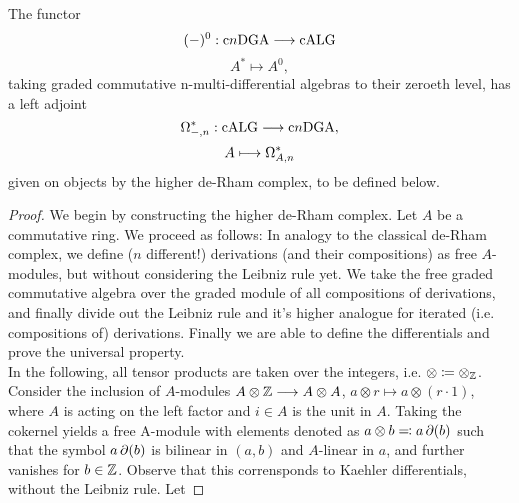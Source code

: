 \begin{prop}\label{prop_higher_de_rahm_complex}
The functor%
$$(-)^0 : \mathrm{c}n\mathrm{DGA} \longrightarrow \mathrm{cALG}$$%
$$A^* \longmapsto A^0,$$%
taking graded commutative n-multi-differential algebras to their zeroeth level, has a left adjoint%
$$\Omega_{-,n}^{*}: \mathrm{cALG} \longrightarrow \mathrm{c}n\mathrm{DGA},$$%
$$A \longmapsto \Omega_{A,n}^{*}$$
given on objects by the higher de-Rham complex, to be defined below.
\begin{proof}
We begin by constructing the higher de-Rham complex. Let $A$ be a commutative ring. We proceed as follows: In analogy to the classical de-Rham complex, we define ($n$ different!) derivations (and their compositions) as free $A$-modules, but without considering the Leibniz rule yet. We take the free graded commutative algebra over the graded module of all compositions of derivations, and finally divide out the Leibniz rule and it's higher analogue for iterated (i.e. compositions of) derivations. Finally we are able to define the differentials and prove the universal property.\\
In the following, all tensor products are taken over the integers, i.e. $\otimes \coloneqq \otimes_{\mathbb{Z}}$. Consider the inclusion of $A$-modules $A \otimes \mathbb{Z} \longrightarrow A \otimes A$, $a\otimes r \longmapsto a \otimes (r \cdot 1)$, where $A$ is acting on the left factor and $i \in A$ is the unit in $A$. Taking the cokernel yields a free A-module with elements denoted as $a\otimes b \eqqcolon a \operatorname{\partial} (b)$ such that the symbol $a \operatorname{\partial} (b)$ is bilinear in $(a,b)$ and $A$-linear in $a$, and further vanishes for $b \in \mathbb{Z}$. Observe that this corrensponds to Kaehler differentials, without the Leibniz rule. Let

\end{proof}
\end{prop}
